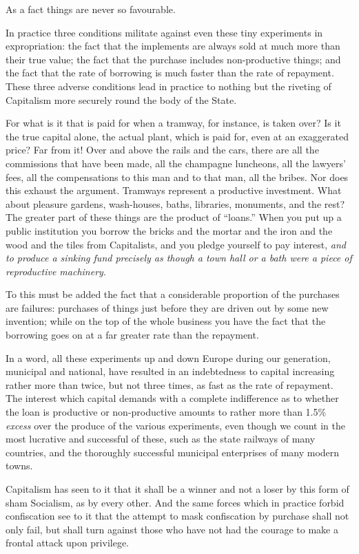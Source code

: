 \documentclass{book}
\begin{document}
As a fact things are never so favourable.

In practice three conditions militate against even these tiny experiments in expropriation: the fact that the implements are always sold at much more than their true value; the fact that the purchase includes non-productive things; and the fact that the rate of borrowing is much faster than the rate of repayment. These three adverse conditions lead in practice to nothing but the riveting of Capitalism more securely round the body of the State.

For what is it that is paid for when a tramway, for instance, is taken over? Is it the true capital alone, the actual plant, which is paid for, even at an exaggerated price? Far from it! Over and above the rails and the cars, there are all the commissions that have been made, all the champagne luncheons, all the lawyers’ fees, all the compensations to this man and to that man, all the bribes. Nor does this exhaust the argument. Tramways represent a productive investment. What about pleasure gardens, wash-houses, baths, libraries, monuments, and the rest? The greater part of these things are the product of “loans.” When you put up a public institution you borrow the bricks and the mortar and the iron and the wood and the tiles from Capitalists, and you pledge yourself to pay interest, \emph{and to produce a sinking fund precisely as though a town hall or a bath were a piece of reproductive machinery}.

To this must be added the fact that a considerable proportion of the purchases are failures: purchases of things just before they are driven out by some new invention; while on the top of the whole business you have the fact that the borrowing goes on at a far greater rate than the repayment.

In a word, all these experiments up and down Europe during our generation, municipal and national, have resulted in an indebtedness to capital increasing rather more than twice, but not three times, as fast as the rate of repayment. The interest which capital demands with a complete indifference as to whether the loan is productive or non-productive amounts to rather more than 1.5\% \emph{excess} over the produce of the various experiments, even though we count in the most lucrative and successful of these, such as the state railways of many countries, and the thoroughly successful municipal enterprises of many modern towns.

Capitalism has seen to it that it shall be a winner and not a loser by this form of sham Socialism, as by every other. And the same forces which in practice forbid confiscation see to it that the attempt to mask confiscation by purchase shall not only fail, but shall turn against those who have not had the courage to make a frontal attack upon privilege.
\end{document}
